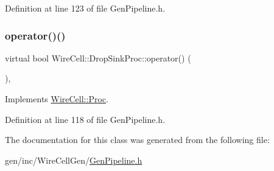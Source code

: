 Definition at line 123 of file Gen\+Pipeline.\+h.

\mbox{\label{class_wire_cell_1_1_drop_sink_proc_a0bd6060109102714f2ee63aa340b9bcd}} 
\subsubsection{\texorpdfstring{operator()()}{operator()()}}
{\footnotesize\ttfamily virtual bool Wire\+Cell\+::\+Drop\+Sink\+Proc\+::operator() (\begin{DoxyParamCaption}{ }\end{DoxyParamCaption})\hspace{0.3cm}{\ttfamily [inline]}, {\ttfamily [virtual]}}



Implements \hyperlink{class_wire_cell_1_1_proc_a9c642ed1f6b6741633c6cb1bd063b502}{Wire\+Cell\+::\+Proc}.



Definition at line 118 of file Gen\+Pipeline.\+h.



The documentation for this class was generated from the following file\+:\begin{DoxyCompactItemize}
\item 
gen/inc/\+Wire\+Cell\+Gen/\hyperlink{_gen_pipeline_8h}{Gen\+Pipeline.\+h}\end{DoxyCompactItemize}
